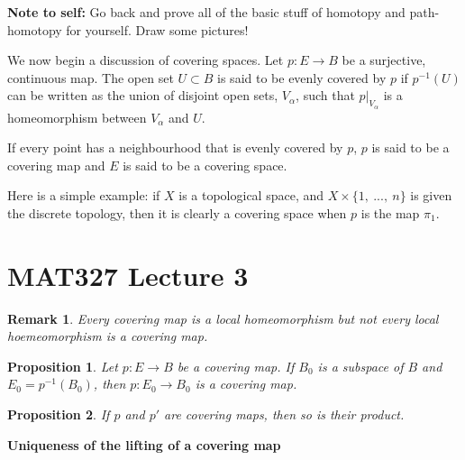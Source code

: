 \documentclass[10pt, oneside]{amsart}
\newtheorem{rem}{Remark}
\newtheorem{prop}{Proposition}
\begin{document}
    \textbf{Note to self:} Go back and prove all of the basic stuff of homotopy and path-homotopy for yourself. Draw some pictures!
    \newline

    We now begin a discussion of covering spaces. Let $p : E \rightarrow B$ be a surjective, continuous map. The open set $U \subset B$ is said to be evenly covered
    by $p$ if $p^{-1}(U)$ can be written as the union of disjoint open sets, $V_{\alpha}$, such that $p|_{V_{\alpha}}$ is a homeomorphism between $V_{\alpha}$ and $U$.
    \newline

    If every point has a neighbourhood that is evenly covered by $p$, $p$ is said to be a covering map and $E$ is said to be a covering space.
    \newline

    Here is a simple example: if $X$ is a topological space, and $X \times \{1, \ ..., \ n\}$ is given the discrete topology, then it is clearly a covering space when
    $p$ is the map $\pi_1$.
    \newline

    \section{MAT327 Lecture 3}

    \begin{rem}
      Every covering map is a local homeomorphism but not every local hoemeomorphism is a covering map.
    \end{rem}

    \begin{prop}
      Let $p : E \rightarrow B$ be a covering map. If $B_0$ is a subspace of $B$ and $E_0 = p^{-1}(B_0)$, then $p : E_0 \rightarrow B_0$ is a covering map.
    \end{prop}

    \begin{prop}
      If $p$ and $p'$ are covering maps, then so is their product.
    \end{prop}

    \textbf{Uniqueness of the lifting of a covering map}
    \newline
    
    

    
\end{document}
